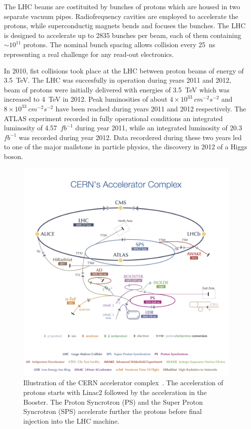 The LHC beams are costituited by bunches of protons which are housed in two separate vacuum pipes. 
Radiofrequency cavities are employed  to accelerate the protons,
while superconductig magnets bends and focuses the bunches.
The LHC is designed to accelerate up to 2835 bunches per beam, each of them containing $\sim 10^{11}$ protons.
The nominal bunch spacing allows collision every 25~ns representing a real challenge for any read-out electronics.

In 2010, fist collisions took place at the LHC between proton beams of energy of 3.5~TeV. The LHC was succesfully in 
operation during years 2011 and 2012, beam of protons were initially delivered with energies of 3.5~TeV  which was increased to 4~TeV in 2012.
Peak luminosities of about $4\times10^{33} ~ cm^{-2}s^{-2}$ and $8\times10^{33} ~ cm^{-2}s^{-2}$  have been reached 
during years 2011 and 2012 respectively. The ATLAS experiment recorded in fully operational conditions an integrated luminosity of 4.57~$fb^{-1}$ 
during year 2011, while an integrated luminosity of 20.3~$fb^{-1}$ was recorded during year 2012.
Data recordered during  these two years  led to one of the major mailstone in particle physics, the discovery in 2012 of a Higgs boson.





\begin{figure}[tp]
     \begin{center}

            \includegraphics[width=\textwidth]{figure/LHC2.jpg}

    \end{center}
    \caption{Illustration of the CERN accelerator complex~\cite{lhcImage}. The acceleration of protons starts with Linac2 followed by the
	acceleration in the Booster. The Proton Syncrotron (PS) and the Super Proton Syncrotron (SPS) accelerate further the protons before
	final injection into the LHC  machine.}


   \label{fig:LHC}
\end{figure}


